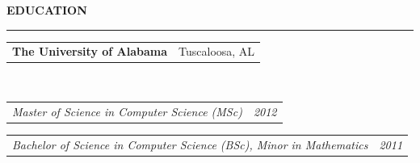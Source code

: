 \documentclass[11pt,letterpaper]{article}
\makeatletter
\newcommand{\header}[1]{%
  \vspace{6pt}%
  {\large\bfseries\color{accent}\MakeUppercase{#1}}\par\nobreak\vspace{-3pt}%
  {\color{accent}\rule{\linewidth}{0.9pt}}\par\nobreak\vspace{3pt}%
  \@afterheading}
\newcommand{\headerrow}[2]{%
  \begin{tabular*}{\linewidth}{@{}l@{\extracolsep{\fill}}r@{}}#1 & #2\end{tabular*}}
\newcommand{\education}[5]{%
  \headerrow{\textbf{#1}}{\color{muted}#2}\\
  \headerrow{{\itshape\color{accent}#3}}{\color{muted}\itshape #4}
  #5
}
\makeatother
\begin{document}


\vspace*{3pt}

\header{Education}
\education{The University of Alabama}{Tuscaloosa, AL}{Master of Science in Computer Science (MSc)}{2012}{
	\headerrow{{\itshape\color{accent}Bachelor of Science in Computer Science (BSc), Minor in Mathematics}}{\color{muted}\itshape 2011}
}

\vspace*{-4pt}
\end{document}
